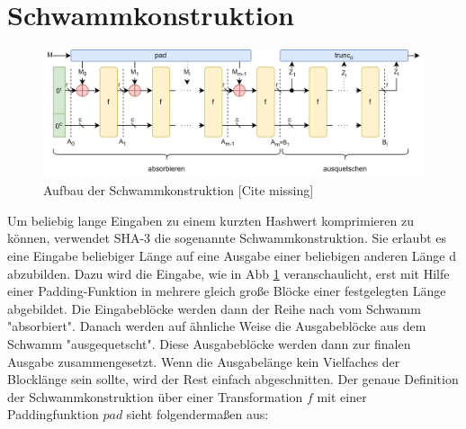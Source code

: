 \section{Schwammkonstruktion}
	\label{sec:schwammkonstruktion}
	\begin{figure}
		\center
		\includegraphics[scale=0.175]{images/Schwammkonstruktion.png}
		\caption{Aufbau der Schwammkonstruktion [Cite missing]}
		\label{fig:schwammkonstruktion}
	\end{figure}
	Um beliebig lange Eingaben zu einem kurzten Hashwert komprimieren zu können, verwendet SHA-3 die sogenannte Schwammkonstruktion.
	Sie erlaubt es eine Eingabe beliebiger Länge auf eine Ausgabe einer beliebigen anderen Länge d abzubilden.
	Dazu wird die Eingabe, wie in Abb \ref{fig:schwammkonstruktion} veranschaulicht, erst mit Hilfe einer Padding-Funktion in mehrere gleich große Blöcke einer festgelegten Länge abgebildet.
	Die Eingabeblöcke werden dann der Reihe nach vom Schwamm "absorbiert". Danach werden auf ähnliche Weise die Ausgabeblöcke aus dem Schwamm "ausgequetscht".
	Diese Ausgabeblöcke werden dann zur finalen Ausgabe zusammengesetzt. Wenn die Ausgabelänge kein Vielfaches der Blocklänge sein sollte, wird der Rest einfach abgeschnitten.
	Der genaue Definition der Schwammkonstruktion über einer Transformation $f$ mit einer Paddingfunktion $pad$ sieht folgendermaßen aus:
	
